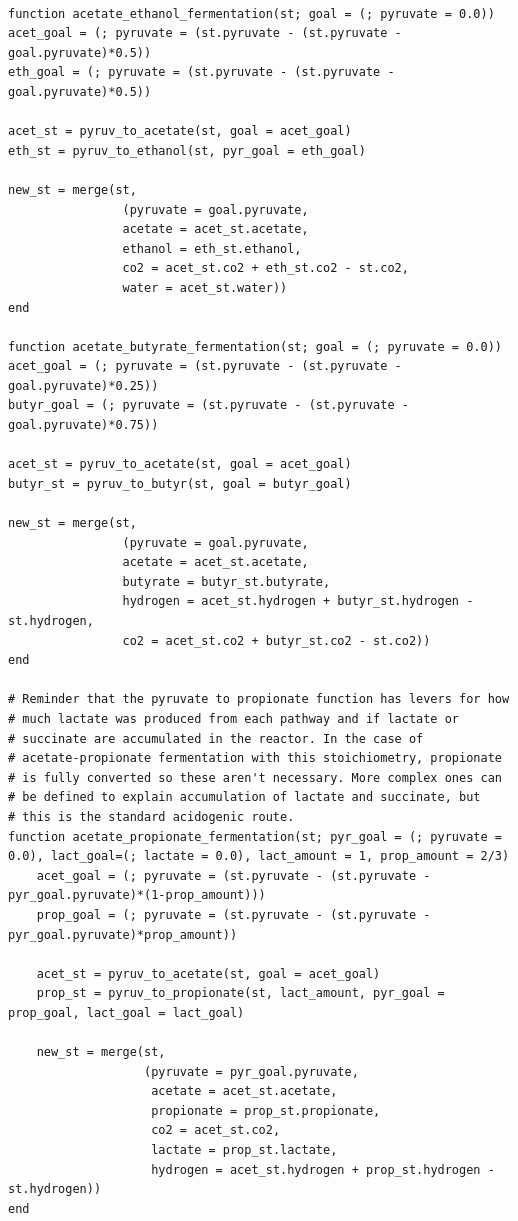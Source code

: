 \documentclass[11pt]{article}
\begin{document}
\begin{verbatim}

function acetate_ethanol_fermentation(st; goal = (; pyruvate = 0.0))
acet_goal = (; pyruvate = (st.pyruvate - (st.pyruvate - goal.pyruvate)*0.5))
eth_goal = (; pyruvate = (st.pyruvate - (st.pyruvate - goal.pyruvate)*0.5))

acet_st = pyruv_to_acetate(st, goal = acet_goal)
eth_st = pyruv_to_ethanol(st, pyr_goal = eth_goal)

new_st = merge(st,
                (pyruvate = goal.pyruvate,
                acetate = acet_st.acetate,
                ethanol = eth_st.ethanol,
                co2 = acet_st.co2 + eth_st.co2 - st.co2,
                water = acet_st.water))
end

function acetate_butyrate_fermentation(st; goal = (; pyruvate = 0.0))
acet_goal = (; pyruvate = (st.pyruvate - (st.pyruvate - goal.pyruvate)*0.25))
butyr_goal = (; pyruvate = (st.pyruvate - (st.pyruvate - goal.pyruvate)*0.75))

acet_st = pyruv_to_acetate(st, goal = acet_goal)
butyr_st = pyruv_to_butyr(st, goal = butyr_goal)

new_st = merge(st,
                (pyruvate = goal.pyruvate,
                acetate = acet_st.acetate,
                butyrate = butyr_st.butyrate,
                hydrogen = acet_st.hydrogen + butyr_st.hydrogen - st.hydrogen,
                co2 = acet_st.co2 + butyr_st.co2 - st.co2))
end

# Reminder that the pyruvate to propionate function has levers for how
# much lactate was produced from each pathway and if lactate or
# succinate are accumulated in the reactor. In the case of
# acetate-propionate fermentation with this stoichiometry, propionate
# is fully converted so these aren't necessary. More complex ones can
# be defined to explain accumulation of lactate and succinate, but
# this is the standard acidogenic route.
function acetate_propionate_fermentation(st; pyr_goal = (; pyruvate = 0.0), lact_goal=(; lactate = 0.0), lact_amount = 1, prop_amount = 2/3)
    acet_goal = (; pyruvate = (st.pyruvate - (st.pyruvate - pyr_goal.pyruvate)*(1-prop_amount)))
    prop_goal = (; pyruvate = (st.pyruvate - (st.pyruvate - pyr_goal.pyruvate)*prop_amount))

    acet_st = pyruv_to_acetate(st, goal = acet_goal)
    prop_st = pyruv_to_propionate(st, lact_amount, pyr_goal = prop_goal, lact_goal = lact_goal)

    new_st = merge(st,
                   (pyruvate = pyr_goal.pyruvate,
                    acetate = acet_st.acetate,
                    propionate = prop_st.propionate,
                    co2 = acet_st.co2,
                    lactate = prop_st.lactate,
                    hydrogen = acet_st.hydrogen + prop_st.hydrogen - st.hydrogen))
end

\end{verbatim}
\end{document}
